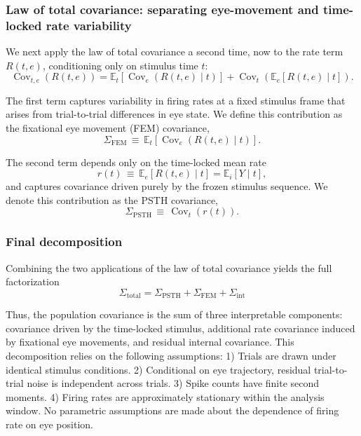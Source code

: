 \documentclass{lite}
\newcommand{\E}{\mathbb{E}}
\newcommand{\C}{\operatorname{Cov}}
\begin{document}
\subsubsection{Law of total covariance: separating eye-movement and time-locked rate variability}

We next apply the law of total covariance a second time, now to the rate term $R(t,e)$, conditioning only on stimulus time $t$:
\begin{equation}
\C_{t,e}(R(t,e))
= \E_{t}\!\left[ \C_{e}(R(t,e) \mid t) \right]
+ \C_{t}\!\left( \E_{e}[R(t,e) \mid t] \right).
\end{equation}

The first term captures variability in firing rates at a fixed stimulus frame that arises from trial-to-trial differences in eye state. We define this contribution as the fixational eye movement (FEM) covariance,
\begin{equation}
\Sigma_{\text{FEM}} \,\equiv\, \E_{t}\!\left[ \C_{e}(R(t,e) \mid t) \right].
\end{equation}

The second term depends only on the time-locked mean rate
\begin{equation}
r(t) \,\equiv\, \E_{e}[R(t,e) \mid t] = \E_{i}[Y \mid t],
\end{equation}
and captures covariance driven purely by the frozen stimulus sequence. We denote this contribution as the PSTH covariance,
\begin{equation}
\Sigma_{\text{PSTH}} \,\equiv\, \C_{t}(r(t)).
\end{equation}

\subsubsection{Final decomposition}

Combining the two applications of the law of total covariance yields the full factorization
\begin{equation}
\Sigma_{\text{total}} = \Sigma_{\text{PSTH}} + \Sigma_{\text{FEM}} + \Sigma_{\text{int}}
\end{equation}

Thus, the population covariance is the sum of three interpretable components: covariance driven by the time-locked stimulus, additional rate covariance induced by fixational eye movements, and residual internal covariance. This decomposition relies on the following assumptions: 1) Trials are drawn under identical stimulus conditions. 2) Conditional on eye trajectory, residual trial-to-trial noise is independent across trials. 3) Spike counts have finite second moments.
4) Firing rates are approximately stationary within the analysis window. No parametric assumptions are made about the dependence of firing rate on eye position. 
\end{document}
